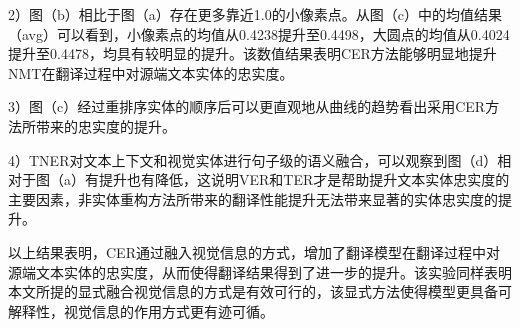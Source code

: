 2）图（b）相比于图（a）存在更多靠近1.0的小像素点。从图（c）中的均值结果（avg）可以看到，小像素点的均值从0.4238提升至0.4498，大圆点的均值从0.4024提升至0.4478，均具有较明显的提升。该数值结果表明CER方法能够明显地提升NMT在翻译过程中对源端文本实体的忠实度。

3）图（c）经过重排序实体的顺序后可以更直观地从曲线的趋势看出采用CER方法所带来的忠实度的提升。

4）TNER对文本上下文和视觉实体进行句子级的语义融合，可以观察到图（d）相对于图（a）有提升也有降低，这说明VER和TER才是帮助提升文本实体忠实度的主要因素，非实体重构方法所带来的翻译性能提升无法带来显著的实体忠实度的提升。


以上结果表明，CER通过融入视觉信息的方式，增加了翻译模型在翻译过程中对源端文本实体的忠实度，从而使得翻译结果得到了进一步的提升。该实验同样表明本文所提的显式融合视觉信息的方式是有效可行的，该显式方法使得模型更具备可解释性，视觉信息的作用方式更有迹可循。